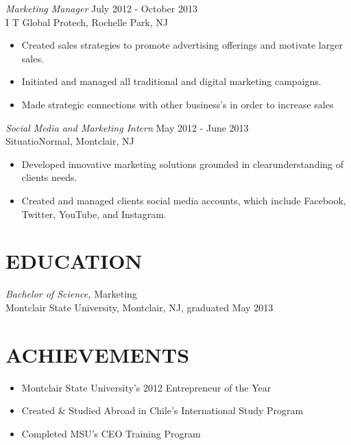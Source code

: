\documentclass[margin]{res}
\begin{document}
\begin{resume}
                {\sl Marketing Manager} \hfill July 2012 - October 2013 \\
                I T Global Protech, Rochelle Park, NJ
                 \begin{itemize}  \itemsep -2pt %
                 \item Created sales strategies to promote advertising offerings and motivate larger sales.
                 \item Initiated and managed all traditional and digital marketing campaigns.
                 \item Made strategic connections with other business's in order to increase sales
                 \end{itemize}
                 
               {\sl Social Media and Marketing Intern} \hfill            May 2012 - June 2013 \\
                SituatioNormal, Montclair, NJ
                 \begin{itemize}  \itemsep -2pt %
                 \item Developed innovative marketing solutions grounded in clearunderstanding of clients needs.
                 \item Created and managed clients social media accounts, which include Facebook, Twitter,
                 YouTube, and Instagram.
                 \end{itemize} 
 
\section{EDUCATION} {\sl Bachelor of Science,} Marketing \\
                Montclair State University, Montclair, NJ, 
                graduated May 2013 \\
\section{ACHIEVEMENTS}
\begin{itemize} 

		\item Montclair State University's 2012 Entrepreneur of the Year
		\item Created \& Studied Abroad in Chile's International Study Program
		\item Completed MSU's CEO Training Program 
					                
					                 
\end{itemize}

\end{resume}
\end{document}

